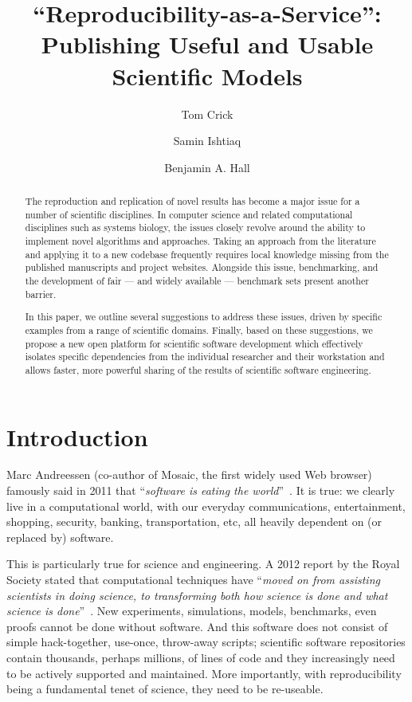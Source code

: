 \documentclass[a4paper,11pt]{article}
\title{``Reproducibility-as-a-Service'':\\Publishing Useful and Usable Scientific Models}
\author[1]{Tom Crick}
\author[2]{Samin Ishtiaq}
\author[3]{Benjamin A. Hall}
\affil[1]{Department of Computing \& Information Systems, Cardiff
  Metropolitan University, UK}
\affil[2]{Microsoft Research Cambridge, UK}
\affil[3]{MRC Cancer Unit, University of Cambridge, UK}
\affil[1]{\protect\url{tcrick@cardiffmet.ac.uk}}
\affil[2]{\protect\url{samin.ishtiaq@microsoft.com}}
\affil[3]{\protect\url{bh418@mrc-cu.cam.ac.uk}}
\date{ }
\begin{document}
\maketitle

\begin{abstract}
The reproduction and replication of novel results has become a major
issue for a number of scientific disciplines. In computer science and
related computational disciplines such as systems biology, the issues
closely revolve around the ability to implement novel algorithms and
approaches. Taking an approach from the literature and applying it to
a new codebase frequently requires local knowledge missing from the
published manuscripts and project websites. Alongside this issue,
benchmarking, and the development of fair --- and widely available ---
benchmark sets present another barrier.

In this paper, we outline several suggestions to address these issues,
driven by specific examples from a range of scientific domains.
Finally, based on these suggestions, we propose a new open platform
for scientific software development which effectively isolates
specific dependencies from the individual researcher and their
workstation and allows faster, more powerful sharing of the results of
scientific software engineering.
\end{abstract}

\section{Introduction}

Marc Andreessen (co-author of Mosaic, the first widely used Web
browser) famously said in 2011 that ``{\emph{software is eating the
world}}''~\cite{andreessen:2011}. It is true: we clearly live in a
computational world, with our everyday communications, entertainment,
shopping, security, banking, transportation, etc, all heavily
dependent on (or replaced by) software.

This is particularly true for science and engineering. A 2012 report
by the Royal Society stated that computational techniques have
``{\emph{moved on from assisting scientists in doing science, to
transforming both how science is done and what science is
done}}''~\cite{rssaaoe:2012}. New experiments, simulations, models,
benchmarks, even proofs cannot be done without software. And this
software does not consist of simple hack-together, use-once,
throw-away scripts; scientific software repositories contain
thousands, perhaps millions, of lines of code and they increasingly
need to be actively supported and maintained. More importantly, with
reproducibility being a fundamental tenet of science, they need to be
re-useable.
\end{document}

